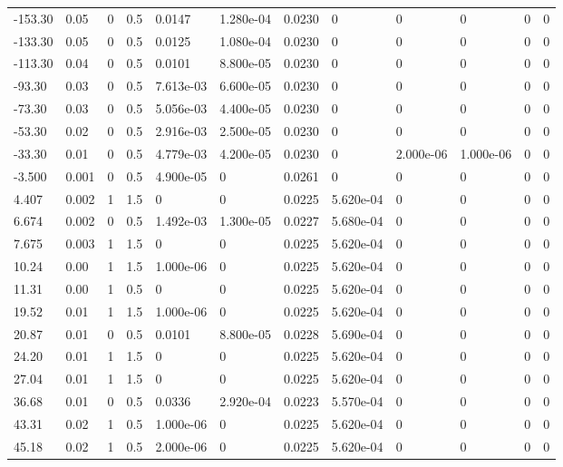 \documentclass[preview]{standalone}
\begin{document}
{{\begin{tabular}{L{1.2cm}C{1.2cm} C{0.3cm}C{0.5cm} C{1.4cm}C{1.4cm} C{1.4cm}C{1.4cm} C{1.6cm}C{1.6cm} C{1.6cm}C{1.6cm}}
  -153.30  &  0.05  & 0     & 0.5 &  0.0147  & 1.280e-04  &  0.0230&   0& 0 & 0   &  0 & 0  \\ 
  -133.30  &  0.05  & 0     & 0.5 &  0.0125  & 1.080e-04  &  0.0230&   0& 0 & 0   &  0 & 0  \\ 
  -113.30  &  0.04  & 0     & 0.5 &  0.0101  & 8.800e-05  &  0.0230&   0& 0 & 0   &  0 & 0  \\ 
  -93.30  &  0.03  & 0     & 0.5 &  7.613e-03  & 6.600e-05  &  0.0230&   0& 0 & 0   &  0 & 0  \\ 
  -73.30  &  0.03  & 0     & 0.5 &  5.056e-03  & 4.400e-05  &  0.0230&   0& 0 & 0   &  0 & 0  \\ 
  -53.30  &  0.02  & 0     & 0.5 &  2.916e-03  & 2.500e-05  &  0.0230&   0& 0 & 0   &  0 & 0  \\ 
  -33.30  &  0.01  & 0     & 0.5 &  4.779e-03  & 4.200e-05  &  0.0230&   0& 2.000e-06 & 1.000e-06   &  0 & 0  \\ 
  -3.500  &  0.001  & 0     & 0.5 &  4.900e-05  & 0  &  0.0261&   0& 0 & 0   &  0 & 0  \\ 
  4.407  &  0.002  & 1     & 1.5 &  0  & 0  &  0.0225&   5.620e-04& 0 & 0   &  0 & 0  \\ 
  6.674  &  0.002  & 0     & 0.5 &  1.492e-03  & 1.300e-05  &  0.0227&   5.680e-04& 0 & 0   &  0 & 0  \\ 
  7.675  &  0.003  & 1     & 1.5 &  0  & 0  &  0.0225&   5.620e-04& 0 & 0   &  0 & 0  \\ 
  10.24  &  0.00  & 1     & 1.5 &  1.000e-06  & 0  &  0.0225&   5.620e-04& 0 & 0   &  0 & 0  \\ 
  11.31  &  0.00  & 1     & 0.5 &  0  & 0  &  0.0225&   5.620e-04& 0 & 0   &  0 & 0  \\ 
  19.52  &  0.01  & 1     & 1.5 &  1.000e-06  & 0  &  0.0225&   5.620e-04& 0 & 0   &  0 & 0  \\ 
  20.87  &  0.01  & 0     & 0.5 &  0.0101  & 8.800e-05  &  0.0228&   5.690e-04& 0 & 0   &  0 & 0  \\ 
  24.20  &  0.01  & 1     & 1.5 &  0  & 0  &  0.0225&   5.620e-04& 0 & 0   &  0 & 0  \\ 
  27.04  &  0.01  & 1     & 1.5 &  0  & 0  &  0.0225&   5.620e-04& 0 & 0   &  0 & 0  \\ 
  36.68  &  0.01  & 0     & 0.5 &  0.0336  & 2.920e-04  &  0.0223&   5.570e-04& 0 & 0   &  0 & 0  \\ 
  43.31  &  0.02  & 1     & 0.5 &  1.000e-06  & 0  &  0.0225&   5.620e-04& 0 & 0   &  0 & 0  \\ 
  45.18  &  0.02  & 1     & 0.5 &  2.000e-06  & 0  &  0.0225&   5.620e-04& 0 & 0   &  0 & 0  \\ 

\end{tabular}}}
\end{document}
